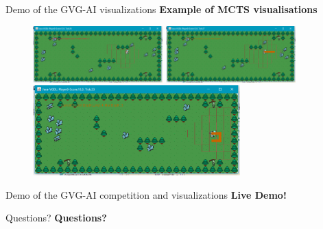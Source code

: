 \documentclass{beamer}
\begin{document}
\begin{frame}{Demo of the GVG-AI visualizations}
		\textbf{Example of MCTS visualisations}
		\begin{figure}[t]
				\includegraphics[width=5cm]{Game-51-5}
				\includegraphics[width=5cm]{Game-51-6}
				\includegraphics[width=8cm]{Game-51-7}
		\end{figure} 
\end{frame}

\begin{frame}{Demo of the GVG-AI competition and visualizations}
\center
		\textbf{Live Demo!}
\end{frame}


\begin{frame}{Questions?}
\center
		\textbf{Questions?}
\end{frame}
\end{document}
